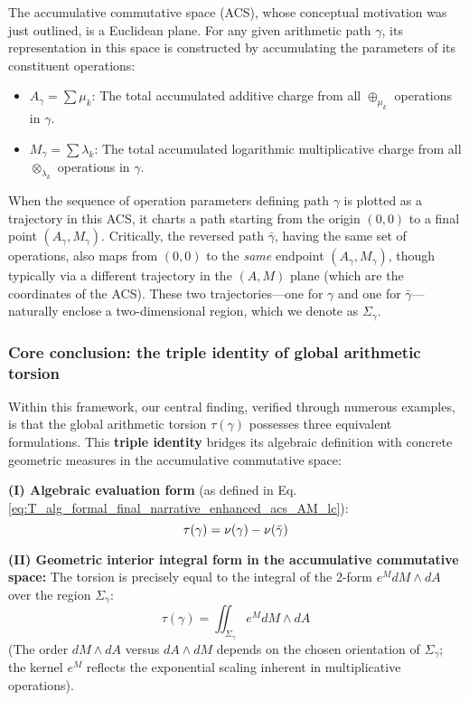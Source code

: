 The accumulative commutative space (ACS), whose conceptual motivation was just outlined, is a Euclidean plane. For any given arithmetic path $\gamma$, its representation in this space is constructed by accumulating the parameters of its constituent operations:
\begin{itemize}
    \item $A_\gamma = \sum \mu_k$: The total accumulated additive charge from all $\oplus_{\mu_k}$ operations in $\gamma$.
    \item $M_\gamma = \sum \lambda_k$: The total accumulated logarithmic multiplicative charge from all $\otimes_{\lambda_k}$ operations in $\gamma$.
\end{itemize}
When the sequence of operation parameters defining path $\gamma$ is plotted as a trajectory in this ACS, it charts a path starting from the origin $(0,0)$ to a final point $(A_\gamma, M_\gamma)$. Critically, the reversed path $\bar{\gamma}$, having the same set of operations, also maps from $(0,0)$ to the \textit{same} endpoint $(A_\gamma, M_\gamma)$, though typically via a different trajectory in the $(A,M)$ plane (which are the coordinates of the ACS). These two trajectories---one for $\gamma$ and one for $\bar{\gamma}$---naturally enclose a two-dimensional region, which we denote as $\Sigma_\gamma$.

\subsubsection*{Core conclusion: the triple identity of global arithmetic torsion}

Within this framework, our central finding, verified through numerous examples, is that the global arithmetic torsion $\tau(\gamma)$ possesses three equivalent formulations. This \textbf{triple identity} bridges its algebraic definition with concrete geometric measures in the accumulative commutative space:

\textbf{(I) Algebraic evaluation form} (as defined in Eq. \ref{eq:T_alg_formal_final_narrative_enhanced_acs_AM_lc}):
\[ \tau(\gamma) = \nu(\gamma) - \nu(\bar{\gamma}) \]

\textbf{(II) Geometric interior integral form in the accumulative commutative space:}
The torsion is precisely equal to the integral of the 2-form $e^M dM \wedge dA$ over the region $\Sigma_\gamma$:
\[ \tau(\gamma) = \iint_{\Sigma_\gamma} e^M dM \wedge dA \]
(The order $dM \wedge dA$ versus $dA \wedge dM$ depends on the chosen orientation of $\Sigma_\gamma$; the kernel $e^M$ reflects the exponential scaling inherent in multiplicative operations).


